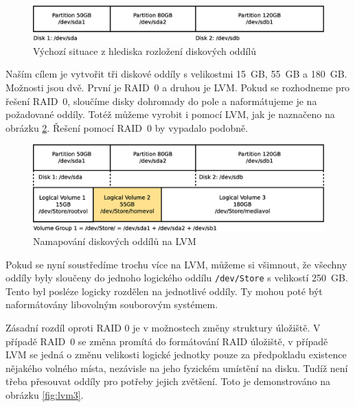 \begin{figure}[] 
    \centering
    \includegraphics[scale=0.42]{obrazky/lvm1.eps}
    \caption{Výchozí situace z hlediska rozložení diskových oddílů}
    \label{fig:lvm1}
\end{figure}Naším cílem je vytvořit tři diskové oddíly s velikostmi 15~GB, 55~GB a 180~GB. Možnosti jsou dvě. První je RAID~0 a druhou je LVM. Pokud se rozhodneme pro řešení RAID~0, sloučíme disky dohromady do pole a naformátujeme je na požadované oddíly. Totéž můžeme vyrobit i pomocí LVM, jak je naznačeno na obrázku \ref{fig:lvm2}. Řešení pomocí RAID~0 by vypadalo podobně.

\begin{figure}[] 
    \centering
    \includegraphics[scale=0.42]{obrazky/lvm2.eps}
    \caption{Namapování diskových oddílů na LVM}
    \label{fig:lvm2}
\end{figure}Pokud se nyní soustředíme trochu více na LVM, můžeme si všimnout, že všechny oddíly byly sloučeny do jednoho logického oddílu \texttt{/dev/Store} s velikostí 250~GB. Tento byl posléze logicky rozdělen na jednotlivé oddíly. Ty mohou poté být naformátovány libovolným souborovým systémem.

Zásadní rozdíl oproti RAID 0 je v možnostech změny struktury úložiště. V případě RAID~0 se změna promítá do formátování RAID úložiště, v případě LVM se jedná o změnu velikosti logické jednotky pouze za předpokladu existence nějakého volného místa, nezávisle na jeho fyzickém umístění na disku. Tudíž není třeba přesouvat oddíly pro potřeby jejich zvětšení. Toto je demonstrováno na obrázku \ref{fig:lvm3}.

